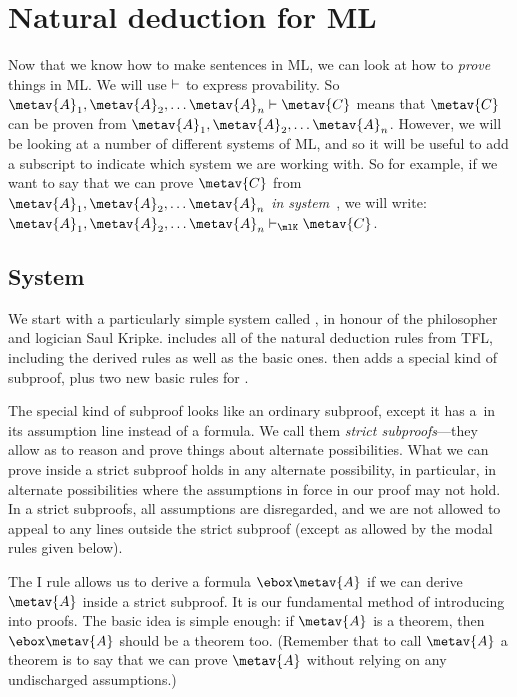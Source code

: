 \chapter{Natural deduction for ML}
\label{Proof}

Now that we know how to make sentences in ML, we can look at how to \emph{prove} things in ML. We will use $\vdash$ to express provability.  So $\metav{A}_1,\metav{A}_2, \dots \metav{A}_n \proves \metav{C}$ means that $\metav{C}$ can be proven from $\metav{A}_1,\metav{A}_2, \dots \metav{A}_n$. However, we will be looking at a number of different systems of ML, and so it will be useful to add a subscript to indicate which system we are working with. So for example, if we want to say that we can prove $\metav{C}$ from $\metav{A}_1,\metav{A}_2, \dots \metav{A}_n$ \emph{in system}~\mlK, we will write: $\metav{A}_1,\metav{A}_2, \dots \metav{A}_n \proves_\mlK \metav{C}$.

\section{System \mlK}
\label{K}

We start with a particularly simple system called \mlK, in honour of the philosopher and logician Saul Kripke. \mlK{} includes all of the natural deduction rules from TFL, including the derived rules as well as the basic ones. \mlK{} then adds a special kind of subproof, plus two new basic rules for \ebox.

The special kind of subproof looks like an ordinary subproof, except it has a~\ebox in its assumption line instead of a formula. We call them \emph{strict subproofs}---they allow as to reason and prove things about alternate possibilities. What we can prove inside a strict subproof holds in any alternate possibility, in particular, in alternate possibilities where the assumptions in force in our proof may not hold. In a strict subproofs, all assumptions are disregarded, and we are not allowed to appeal to any lines outside the strict subproof (except as allowed by the modal rules given below).

The \ebox I rule allows us to derive a formula $\ebox \metav{A}$ if we can derive $\metav{A}$ inside a strict subproof.  It is our fundamental method of introducing \ebox{} into proofs. The basic idea is simple enough: if $\metav{A}$ is a theorem, then $\ebox \metav{A}$ should be a theorem too. (Remember that to call $\metav{A}$ a theorem is to say that we can prove $\metav{A}$ without relying on any undischarged assumptions.)

